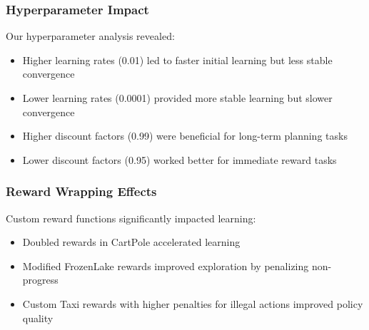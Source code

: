 \documentclass[12pt]{article}
\begin{document}
{{{\subsubsection{Hyperparameter Impact}

Our hyperparameter analysis revealed:

\begin{itemize}
    \item Higher learning rates (0.01) led to faster initial learning but less stable convergence
    \item Lower learning rates (0.0001) provided more stable learning but slower convergence
    \item Higher discount factors (0.99) were beneficial for long-term planning tasks
    \item Lower discount factors (0.95) worked better for immediate reward tasks
\end{itemize}

\subsubsection{Reward Wrapping Effects}

Custom reward functions significantly impacted learning:

\begin{itemize}
    \item Doubled rewards in CartPole accelerated learning
    \item Modified FrozenLake rewards improved exploration by penalizing non-progress
    \item Custom Taxi rewards with higher penalties for illegal actions improved policy quality
\end{itemize}

}}


\newpage

{}}
\end{document}
